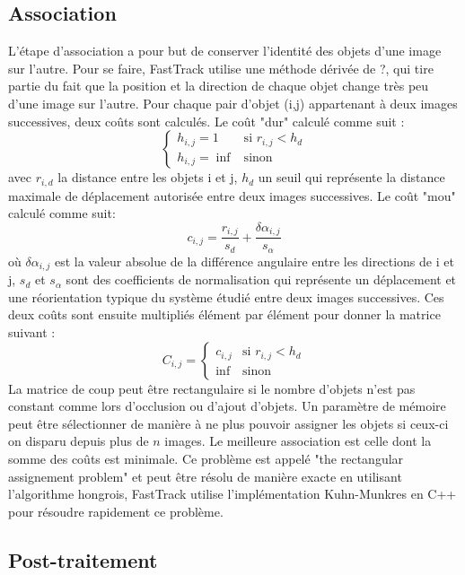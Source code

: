 		
		\subsection{Association}
		
		L'étape d'association a pour but de conserver l'identité des objets d'une image sur l'autre. Pour se faire, FastTrack utilise une méthode dérivée de ?, qui tire partie du fait que la position et la direction de chaque objet change très peu d'une image sur l'autre.
		Pour chaque pair d'objet (i,j) appartenant à deux images successives, deux coûts sont calculés.
		Le coût "dur" calculé comme suit :
        $$
        \left\{
        	\begin{array}{ll}
        		h_{i,j} = 1 & \mbox{si } r_{i,j} < h_{d} \\
        		h_{i,j} = \inf & \mbox{sinon }
        	\end{array}
        \right.       
        $$
        avec $r_{i,d}$ la distance entre les objets i et j, $h_{d}$ un seuil qui représente la distance maximale de déplacement autorisée entre deux images successives.
		Le coût "mou" calculé comme suit:
		$$
        c_{i,j} = \frac{r_{i,j}}{s_d} + \frac{\delta\alpha_{i,j}}{s_{\alpha}}		
		$$
		où $\delta\alpha_{i,j}$ est la valeur absolue de la différence angulaire entre les directions de i et j, $s_{d}$ et $s_{\alpha}$ sont des coefficients de normalisation qui représente un déplacement et une réorientation typique du système étudié entre deux images successives.
		Ces deux coûts sont ensuite multipliés élément par élément pour donner la matrice suivant :
		$$
        C_{i,j} = \left\{
        	\begin{array}{ll}
        		c_{i,j} & \mbox{si } r_{i,j} < h_{d} \\
        		\inf & \mbox{sinon }
        	\end{array}
        \right.       
        $$
		La matrice de coup peut être rectangulaire si le nombre d'objets n'est pas constant comme lors d'occlusion ou d'ajout d'objets. Un paramètre de mémoire peut être sélectionner de manière à ne plus pouvoir assigner les objets si ceux-ci on disparu depuis plus de $n$ images.
		Le meilleure association est celle dont la somme des coûts est minimale. Ce problème est appelé "the rectangular assignement problem" et peut être résolu de manière exacte en utilisant l’algorithme hongrois, FastTrack utilise l'implémentation Kuhn-Munkres en C++ pour résoudre rapidement ce problème.
		
		\subsection{Post-traitement}
		
